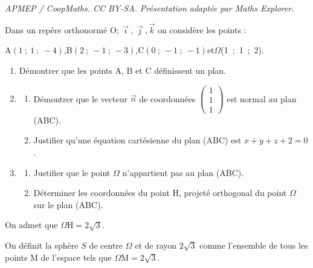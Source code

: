 \documentclass[10pt]{article}
\providecommand{\vect}[1]{\overrightarrow{#1}}
\providecommand{\Oijk}{\(\mathrm{O};\vec{\imath},\vec{\jmath},\vec{k}\)}
\begin{document}
\noindent\textit{APMEP / CoopMaths. CC BY-SA. Présentation adaptée par Maths Explorer.}\par\medskip
\medskip

Dans un repère orthonormé \Oijk{} on considère les points :
\begin{center} A$(1~;~1~;~-4)$,\quad B$(2~;~-1~;~-3)$,\quad  C$(0~;~-1~;~-1)$\quad  et\quad  $\Omega$(1~;~1~;~2).\end{center}

\smallskip

\begin{enumerate}
\item Démontrer que les points A, B et C définissent un plan.
\item 
	\begin{enumerate}
		\item Démontrer que le vecteur $\vect{n}$ de coordonnées $\begin{pmatrix}1\\1\\1\end{pmatrix}$ est normal au plan (ABC).
		\item Justifier qu'une équation cartésienne du plan (ABC) est $x + y + z + 2 = 0$.
	\end{enumerate}
\item 
	\begin{enumerate}
		\item Justifier que le point $\Omega$ n'appartient pas au plan (ABC).
		\item Déterminer les coordonnées du point H, projeté orthogonal du point $\Omega$ sur le plan (ABC).
	\end{enumerate}
			\end{enumerate}

On admet que $\Omega \text{H} = 2\sqrt 3$.

On définit la sphère $S$ de centre $\Omega$ et de rayon $2\sqrt 3$ comme l'ensemble de tous les points M de l'espace tels que $\Omega\text{M} = 2\sqrt 3$.
\end{document}

